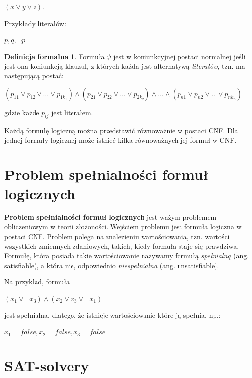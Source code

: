 \documentclass[a4paper,12pt,oneside]{book}
\theoremstyle{definition}
\newtheorem*{formal}{Definicja formalna}
\begin{document}
\begin{center}
    $(x \lor y \lor z)$. 
\end{center}

Przykłady literałów:

\begin{center}
    $p, q, \neg p$
\end{center}

\begin{formal}
    Formuła $\psi$ jest w koniunkcyjnej postaci normalnej jeśli jest ona koniunkcją klauzul, z których każda jest alternatywą \textit{literałów}, tzn. ma następującą postać: 
    \begin{center}
    $(p_{11} \lor p_{12} \lor \ldots \lor p_{1{k_1}}) \land (p_{21} \lor p_{22} \lor \ldots \lor p_{2{k_2}}) \land \ldots \land (p_{n1} \lor p_{n2} \lor \ldots \lor p_{n{k_n}})$
    \end{center}
    gdzie każde $p_{ij}$ jest literałem.
\end{formal}

Każdą formułę logiczną można przedstawić równoważnie w postaci CNF. Dla jednej formuły logicznej może istnieć kilka równoważnych jej formuł w CNF.  

\section{Problem spełnialności formuł logicznych}

\textbf{Problem spełnialności formuł logicznych} jest ważym problemem obliczeniowym w teorii złożoności. Wejściem problemu jest formuła logiczna w postaci CNF. Problem polega na znalezieniu wartościowania, tzn. wartości wszystkich zmiennych zdaniowych, takich, kiedy formuła staje się prawdziwa. Formułę, która posiada takie wartościowanie nazywamy formułą \textit{spełnialną} (ang. satisfiable), a która nie, odpowiednio \textit{niespełnialna} (ang. unsatisfiable).

Na przykład, formuła
\begin{center}
    $(x_1 \lor \neg x_3) \land (x_2 \lor x_3 \lor \neg x_1)$
\end{center}

jest spełnialna, dlatego, że istnieje wartościowanie które ją spełnia, np.:
\begin{center}
    $x_1 = false, x_2 = false, x_3 = false$
\end{center}

\section{SAT-solvery}
\end{document}
